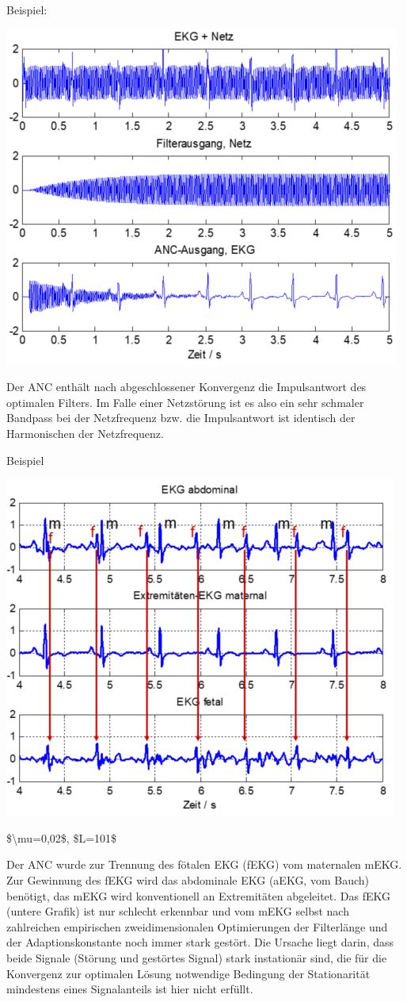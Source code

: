 \documentclass[a4paper]{article}
\begin{document}
\begin{multicols}{3}
  Beispiel:

  \begin{itemize*}
    \item \includegraphics[width=.5\linewidth]{Assets/Biosignalverarbeitung-adaptiver-filter-ekg+netz.png}
    \item Der ANC enthält nach abgeschlossener Konvergenz die Impulsantwort des optimalen Filters. Im Falle einer Netzstörung ist es also ein sehr schmaler Bandpass bei der Netzfrequenz bzw. die Impulsantwort ist identisch der Harmonischen der Netzfrequenz.
  \end{itemize*}

  Beispiel

  \begin{itemize*}
    \item \includegraphics[width=.5\linewidth]{Assets/Biosignalverarbeitung-adaptiver-filter-ekg-abdominal.png}
    \item \$\textbackslash mu=0,02\$, \$L=101\$
    \item Der ANC wurde zur Trennung des fötalen EKG (fEKG) vom maternalen mEKG. Zur Gewinnung des fEKG wird das abdominale EKG (aEKG, vom Bauch) benötigt, das mEKG wird konventionell an Extremitäten abgeleitet. Das fEKG (untere Grafik) ist nur schlecht erkennbar und vom mEKG selbst nach zahlreichen empirischen zweidimensionalen Optimierungen der Filterlänge und der Adaptionskonstante noch immer stark gestört. Die Ursache liegt darin, dass beide Signale (Störung und gestörtes Signal) stark instationär sind, die für die Konvergenz zur optimalen Lösung notwendige Bedingung der Stationarität mindestens eines Signalanteils ist hier nicht erfüllt.
  \end{itemize*}


\end{multicols}
\end{document}
